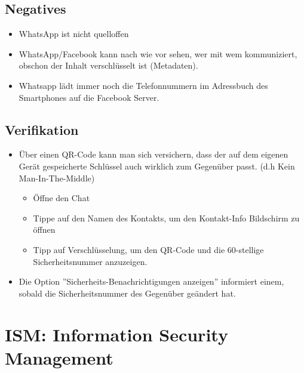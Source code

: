 \subsection{Negatives}
\begin{itemize}
	\item WhatsApp ist nicht quelloffen
	\item WhatsApp/Facebook kann nach wie vor sehen, wer mit wem kommuniziert, obschon der Inhalt verschlüsselt ist (Metadaten).
	\item Whatsapp lädt immer noch die Telefonnummern im Adressbuch des Smartphones auf die Facebook Server.
\end{itemize}

\subsection{Verifikation}
\begin{itemize}
	\item Über einen QR-Code kann man sich versichern, dass der auf dem eigenen Gerät gespeicherte Schlüssel auch wirklich zum Gegenüber passt. (d.h Kein Man-In-The-Middle) 
	\begin{itemize}
		\item Öffne den Chat
		\item Tippe auf den Namen des Kontakts, um den Kontakt-Info Bildschirm zu öffnen
		\item Tipp auf Verschlüsselung, um den QR-Code und die 60-stellige Sicherheitsnummer anzuzeigen.
	\end{itemize}
	\item Die Option ''Sicherheits-Benachrichtigungen anzeigen'' informiert einem, sobald die Sicherheitsnummer des Gegenüber geändert hat.
\end{itemize}

\section{ISM: Information Security Management}
